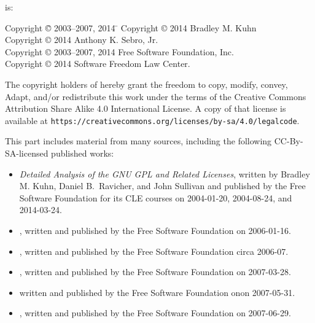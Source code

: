 {\parindent 0in
 is: \\
\begin{tabbing}
Copyright \= \copyright{} 2003--2007, 2014 \hspace{.1mm} \=  \kill
Copyright \> \copyright{} 2014 \> Bradley M. Kuhn \\
Copyright \> \copyright{} 2014 \>  Anthony K. Sebro, Jr. \\
Copyright \> \copyright{} 2003--2007, 2014 \>  Free Software Foundation, Inc. \\
Copyright \> \copyright{} 2014 \>  Software Freedom Law Center.
\end{tabbing}


\vspace{.2in}

\begin{center}

The copyright holders of  hereby grant the freedom to copy, modify,
convey, Adapt, and/or redistribute this work under the terms of the Creative
Commons Attribution Share Alike 4.0 International License.  A copy of that
license is available at
\verb=https://creativecommons.org/licenses/by-sa/4.0/legalcode=.
\end{center}

\vfill

This part includes material from many sources, including the following
CC-By-SA-licensed published works: \\

\begin{itemize}
\item \textit{Detailed Analysis of the GNU GPL and Related Licenses}, written by
Bradley M. Kuhn, Daniel B.~Ravicher, and John Sullivan and published by the Free Software Foundation for its CLE courses on 2004-01-20,
2004-08-24, and 2014-03-24.
\item {}, written and published by the Free
  Software Foundation on 2006-01-16.
\item {}, written and published by the Free
  Software Foundation circa 2006-07.
\item {}, written and published by the Free
  Software Foundation on   2007-03-28.
\item {} written and published by the Free
  Software Foundation onon 2007-05-31.
\item {}, written and published by the Free
  Software Foundation on 2007-06-29.
  

\end{itemize}}
